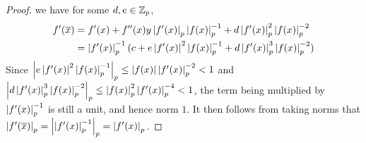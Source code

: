 \begin{proof}
  we have for some $d, e \in \Z_p$, \begin{align*}
    f'(\bar{x})
    &= f'(x) + f''(x) y \abs{f'(x)}_p\abs{f(x)}_p\inv 
    + d  \abs{f'(x)}_p^2 \abs{f(x)}_p^{-2} \\
    &= \abs{f'(x)}_p\inv (c + e \abs{f'(x)}^2\abs{f(x)}_p\inv 
    + d \abs{f'(x)}_p^3 \abs{f(x)}_p^{-2}) 
  \end{align*}
  Since $\abs{e \abs{f'(x)}^2\abs{f(x)}_p\inv}_p \leq 
  \abs{f(x)}\abs{f'(x)}_p^{-2} < 1$ and 
  $\abs{d \abs{f'(x)}_p^3 \abs{f(x)}_p^{-2}}_p \leq 
  \abs{f(x)}_p^{2} \abs{f'(x)}_p^{-4} < 1$,
  the term being multiplied by $\abs{f'(x)}_p\inv$ is still a unit, 
  and hence norm $1$. 
  It then follows from taking norms that 
  $\abs{f'(\bar{x})}_p = \abs{\abs{f'(x)}_p\inv}_p = \abs{f'(x)}_p$.
\end{proof}

